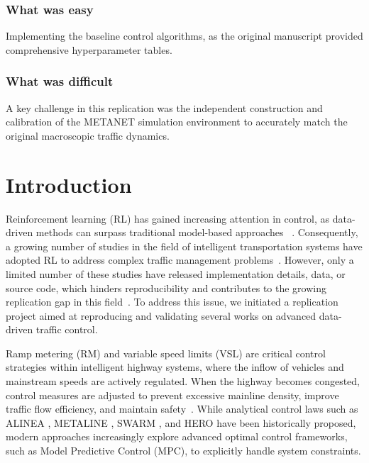 \subsubsection{What was easy}

Implementing the baseline control algorithms, as the original manuscript provided comprehensive hyperparameter tables.

\subsubsection{What was difficult}

A key challenge in this replication was the independent construction and calibration of the METANET simulation environment to accurately match the original macroscopic traffic dynamics.

\section{Introduction}

Reinforcement learning (RL) \cite{Kaelbling1996Survey} has gained increasing attention in control, as data-driven methods can surpass traditional model-based approaches ~\cite{Busoniu2018RLControl,Brunke2022SafeRL, Bertsekas2019RLControl,Gullapalli1992RLControl}. Consequently, a growing number of studies in the field of intelligent transportation systems have adopted RL to address complex traffic management problems~\cite{Mannion2016TrafficRL,Han2023RLTrafficSurvey,Yau2017TrafficSurvey,Bazzan2009MultiagentTraffic, Rasheed2020DeepRLTraffic}. However, only a limited number of these studies have released implementation details, data, or source code, which hinders reproducibility and contributes to the growing replication gap in this field~\cite{Riehl2025Reproducibility}. To address this issue, we initiated a replication project aimed at reproducing and validating several works on advanced data-driven traffic control.

Ramp metering (RM) and variable speed limits (VSL) are critical control strategies within intelligent highway systems, where the inflow of vehicles and mainstream speeds are actively regulated. When the highway becomes congested, control measures are adjusted to prevent excessive mainline density, improve traffic flow efficiency, and maintain safety~\cite{Papageorgiou2003RampOverview,Shaaban2016RampReview}. While analytical control laws such as ALINEA \cite{Papageorgiou1991ALINEA}, METALINE \cite{Diakaki1994METALINE}, SWARM \cite{Paesani1992SWARM}, and HERO \cite{Papamichail2010HERO} have been historically proposed, modern approaches increasingly explore advanced optimal control frameworks, such as Model Predictive Control (MPC), to explicitly handle system constraints.

